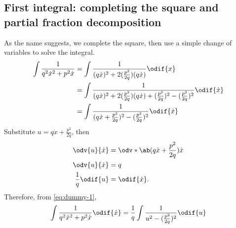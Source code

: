 \subsection{First integral: completing the square and partial fraction decomposition}

As the name suggests, we complete the square, then use a simple change of variables to solve the integral.
\begin{align}
	\int\frac{1}{q^2\dot{x}^2 + p^2\dot{x}} & = \int\frac{1}{(q\dot{x})^2 + 2(\frac{p^2}{2q})(q\dot{x})}\odif{x}                                                 \\
	                                        & = \int\frac{1}{(q\dot{x})^2 + 2(\frac{p^2}{2q})(q\dot{x}) + (\frac{p^2}{2q})^2 - (\frac{p^2}{2q})^2}\odif{\dot{x}} \\
	                                        & = \int\frac{1}{(q\dot{x} + \frac{p^2}{2q})^2 - (\frac{p^2}{2q})^2}\odif{\dot{x}} \label{eq:dummy-1}
\end{align}
Substitute $u = q\dot{x} + \frac{p^2}{2q}$, then
\begin{align}
	\odv{u}{\dot{x}}    & = \odv*{\ab(q\dot{x} + \frac{p^2}{2q})}{\dot{x}} \\
	\odv{u}{\dot{x}}    & = q                                              \\
	\frac{1}{q}\odif{u} & = \odif{\dot{x}}.
\end{align}
Therefore, from \cref{eq:dummy-1},
\begin{equation}
	\int\frac{1}{q^2\dot{x}^2 + p^2\dot{x}}\odif{\dot{x}} = \frac{1}{q}\int\frac{1}{u^2 - (\frac{p^2}{2q})^2}\odif{u} \label{eq:drag-integral-2}
\end{equation}

